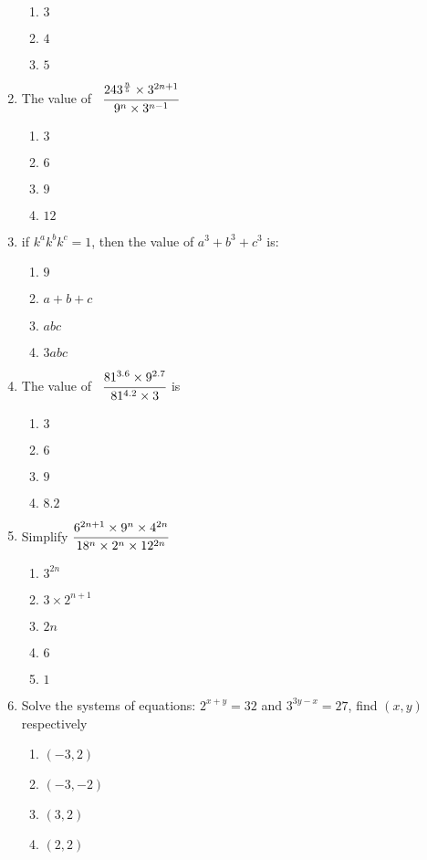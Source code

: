 \begin{multicols}{2}
\begin{enumerate}[label={\arabic*.}]
\begin{enumerate}[label={\Alph*.}]
	\item \(3\)
	\item \(4\)
	\item \(5\)
	\end{enumerate}
\item The value of \, $\cfrac{243^{\frac{n}{5}} \times 3^{2n + 1}}{9^n \times 3^{n-1}}$
	\begin{enumerate}[label={\Alph*.}]
	\item \(3\)
	\item \(6\)
	\item \(9\)
	\item \(12\)
	\end{enumerate}
\item if $k^ak^bk^c = 1$, then the value of $a^3 + b^3 + c^3$ is:
	\begin{enumerate}[label={\Alph*.}]
	\item \(9\)
	\item \(a + b + c\)
	\item \(abc\)
	\item \(3abc\)
	\end{enumerate}
\item The value of \, $\cfrac{81^{3.6} \times 9^{2.7}}{81^{4.2} \times 3}$ is
	\begin{enumerate}[label={\Alph*.}]
	\item \(3\)
	\item \(6\)
	\item \(9\)
	\item \(8.2\)
	\end{enumerate}
\item Simplify $\cfrac{6^{2n +1} \times 9^n \times 4^{2n}}{18^n \times 2^n \times 12^{2n}}$
	\begin{enumerate}[label={\Alph*.}]
	\item \(3^{2n}\)
	\item \(3 \times 2^{n+1}\)
	\item \(2n\)
	\item \(6\)
	\item \(1\)
	\end{enumerate}
\item Solve the systems of equations: $2^{x+y} = 32$  and $3^{3y -x} = 27$, find $(x,y)$ respectively
	\begin{enumerate}[label={\Alph*.}]
	\item \((-3,2)\)
	\item \((-3,-2)\)
	\item \((3,2)\)
	\item \((2,2)\)

\end{enumerate}
\end{enumerate}
\end{multicols}

